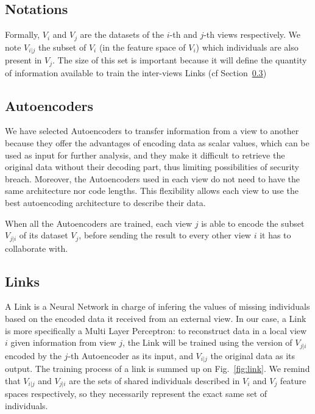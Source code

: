 \subsection{Notations}
\label{sec:precond}
Formally, $V_i$ and $V_j$ are the datasets of the $i$-th and $j$-th views respectively. We note $V_{i|j}$ the subset of $V_i$ (in the feature space of $V_i$) which individuals are also present in $V_j$. The size of this set is important because it will define the quantity of information available to train the inter-views Links (cf Section~\ref{sec:links})
	
		\subsection{Autoencoders}
\label{sec:dae}
		
We have selected Autoencoders to transfer information from a view to another because they offer the advantages of encoding data as scalar values, which can be used as input for further analysis, and they make it difficult to retrieve the original data without their decoding part, thus limiting possibilities of security breach. Moreover, the Autoencoders used in each view do not need to have the same architecture nor code lengths. This flexibility allows each view to use the best autoencoding architecture to describe their data.
		
When all the Autoencoders are trained, each view $j$ is able to encode the subset $V_{j|i}$ of its dataset $V_j$, before sending the result to every other view $i$ it has to collaborate with.
		
		\subsection{Links}
\label{sec:links}
A Link is a Neural Network in charge of infering the values of missing individuals based on the encoded data it received from an external view. In our case, a Link is more specifically a Multi Layer Perceptron: to reconstruct data in a local view $i$ given information from view $j$, the Link will be trained using the version of $V_{j|i}$ encoded by the $j$-th Autoencoder as its input, and $V_{i|j}$ the original data as its output. The training process of a link is summed up on Fig.~\ref{fig:link}. We remind that $V_{i|j}$ and $V_{j|i}$ are the sets of shared individuals described in $V_i$ and $V_j$ feature spaces respectively, so they necessarily represent the exact same set of individuals.

